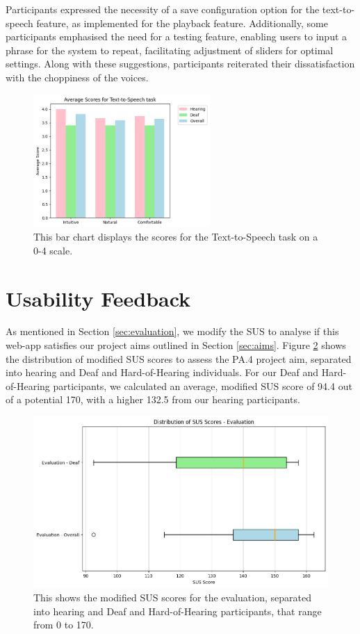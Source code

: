 \documentclass{l4proj}
\begin{document}
Participants expressed the necessity of a save configuration option for the text-to-speech feature, as implemented for the playback feature. Additionally, some participants emphasised the need for a testing feature, enabling users to input a phrase for the system to repeat, facilitating adjustment of sliders for optimal settings. Along with these suggestions, participants reiterated their dissatisfaction with the choppiness of the voices. 

\begin{figure}
    \centering
    \includegraphics[width=0.6\textwidth]{dissertation/images/TTS.png}
    \caption{This bar chart displays the scores for the Text-to-Speech task on a 0-4 scale.}
    \label{fig:TTS-chart}
\end{figure}

\section{Usability Feedback}

As mentioned in Section \ref{sec:evaluation}, we modify the SUS to analyse if this web-app satisfies our project aims outlined in Section \ref{sec:aims}. Figure \ref{fig:eval} shows the distribution of modified SUS scores to assess the PA.4 project aim, separated into hearing and Deaf and Hard-of-Hearing individuals. For our Deaf and Hard-of-Hearing participants, we calculated an average, modified SUS score of 94.4 out of a potential 170, with a higher 132.5 from our hearing participants. 

\begin{figure}
    \centering
    \includegraphics[width=0.75\linewidth]{dissertation/images/EvaluationBoxPlots.png}    
    \caption{This shows the modified SUS scores for the evaluation, separated into hearing and Deaf and Hard-of-Hearing participants, that range from 0 to 170.}
    \label{fig:eval} 
\end{figure}
\end{document}
